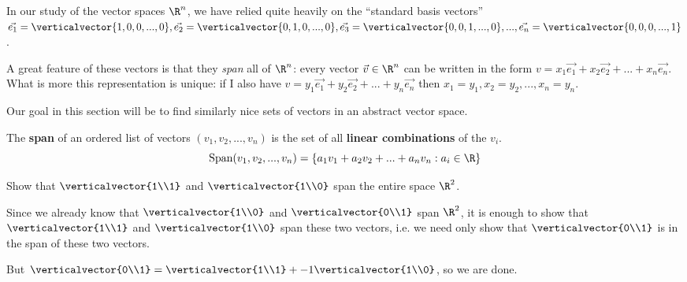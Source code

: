 \documentclass{ximera}
\begin{document}
\begin{Basis and Dimension}

In our study of the vector spaces $\R^n$, we have relied quite heavily on the ``standard basis vectors'' $\vec{e_1}  =\verticalvector{1,0,0,...,0}, 
\vec{e_2}  =\verticalvector{0,1,0,...,0}, \vec{e_3}  =\verticalvector{0,0,1,...,0},..., \vec{e_n}  =\verticalvector{0,0,0,...,1}$.  

A great feature of these vectors is that they \textit{span} all of $\R^n$:  every vector $\vec{v} \in \R^n$ can be written in the form
 $v = x_1\vec{e_1} +x_2\vec{e_2}+...+x_n\vec{e_n}$.  What is more this representation is unique:  if I also have $v = y_1\vec{e_1} +y_2\vec{e_2}+...+y_n\vec{e_n}$
 then $x_1 = y_1, x_2 = y_2, ..., x_n=y_n$.
 
 Our goal in this section will be to find similarly nice sets of vectors in an abstract vector space.
 
 \begin{definition}
 	The \textbf{span} of an ordered list of vectors $(v_1,v_2, ...,v_n)$ is the set of all \textbf{linear combinations} of the $v_i$.
 	\[\textrm{Span}(v_1,v_2, ...,v_n) = \{a_1v_1+a_2v_2+...+a_nv_n: a_i \in \R\}\]
 \end{definition}
 
 
 	Show that $\verticalvector{1\\1}$ and $\verticalvector{1\\0}$ span the entire space $\R^2$.

\begin{free-response}
	Since we already know that $\verticalvector{1\\0}$ and $\verticalvector{0\\1}$ span $\R^2$,
	 it is enough to show that $\verticalvector{1\\1}$ and $\verticalvector{1\\0}$ span these two vectors, i.e.
	 we need only show that $\verticalvector{0\\1}$ is in the span of these two vectors.
	 
	 But $\verticalvector{0\\1} = \verticalvector{1\\1} +-1\verticalvector{1\\0}$, so we are done.
	 

\end{free-response}
\end{Basis and Dimension}
\end{document}
